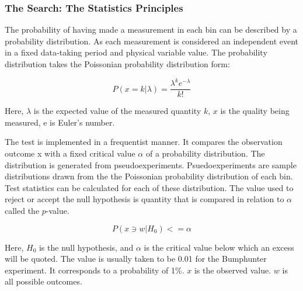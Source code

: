 

\subsubsection{The Search: The Statistics Principles}
The probability of having made a measurement in each bin can be described by a probability distribution. As each measurement is considered an independent event in a fixed data-taking period and physical variable value. The probability distribution takes the Poissonian probability distribution form:

\begin{equation}
 P(x=k|\lambda) = \frac{\lambda^{k}e^{-\lambda}}{k!} 
 \label{eq:Poissonian}
\end{equation}

Here, $\lambda$ is the expected value of the measured quantity $k$, $x$ is the quality being measured, e is Euler's number.

The test is implemented in a frequentist manner. It compares the observation outcome x with a fixed critical value $\alpha$ of a probability distribution. The distribution is generated from pseudoexperiments. Psuedoexperiments are sample distributions drawn from the the Poissonian probability distribution of each bin. Test statistics can be calculated for each of these distribution. The value used to reject or accept the null hypothesis is quantity that is compared in relation to $\alpha$ called the $p$-value. %

\begin{equation}
    P(x \ni w|H_0)<= \alpha 
    \label{eq:test}
\end{equation}

Here, $H_0$ is the null hypothesis, and $\alpha$ is the critical value below which an excess will be quoted. The value is usually taken to be 0.01 for the Bumphunter experiment. It corresponds to a probability of 1\%. $x$ is the observed value. $w$ is all possible outcomes. 



